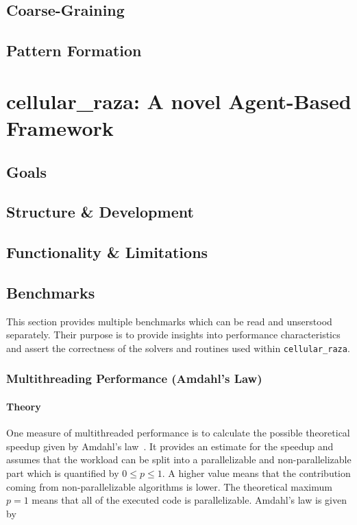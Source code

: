 \documentclass[a4paper]{article}
\begin{document}
\subsection{Coarse-Graining}
\subsection{Pattern Formation}

\pagebreak
\section{cellular\_raza: A novel Agent-Based Framework}
\cite{Pleyer2025}
\subsection{Goals}
\subsection{Structure \& Development}
\subsection{Functionality \& Limitations}

\subsection{Benchmarks}
This section provides multiple benchmarks which can be read and unserstood separately.
Their purpose is to provide insights into performance characteristics and assert the correctness of
the solvers and routines used within \texttt{cellular\_raza}.

\subsubsection{Multithreading Performance (Amdahl's Law)}

\paragraph{Theory}
One measure of multithreaded performance is to calculate the possible theoretical speedup
given by Amdahl's law~\cite{Rodgers1985}.
It provides an estimate for the speedup and assumes that the workload can be split into a
parallelizable and non-parallelizable part which is quantified by $0\leq p \leq1$.
A higher value means that the contribution coming from non-parallelizable algorithms is lower.
The theoretical maximum $p=1$ means that all of the executed code is parallelizable.
Amdahl's law is given by
\end{document}
